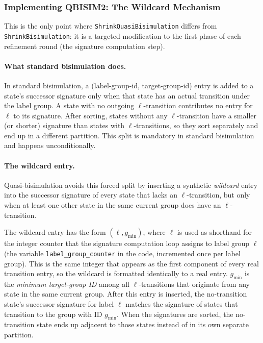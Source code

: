 \documentclass[11pt,a4paper]{article}
\begin{document}
\subsubsection{Implementing QBISIM2: The Wildcard Mechanism}

This is the only point where \texttt{ShrinkQuasiBisimulation} differs from
\texttt{ShrinkBisimulation}: it is a targeted modification to the first phase
of each refinement round (the signature computation step).

\paragraph{What standard bisimulation does.}
In standard bisimulation, a (label-group-id, target-group-id) entry is added
to a state's successor signature only when that state has an actual transition
under the label group.  A state with no outgoing $\ell$-transition contributes
no entry for $\ell$ to its signature.  After sorting, states without any
$\ell$-transition have a smaller (or shorter) signature than states with
$\ell$-transitions, so they sort separately and end up in a different partition.
This split is mandatory in standard bisimulation and happens unconditionally.

\paragraph{The wildcard entry.}
Quasi-bisimulation avoids this forced split by inserting a synthetic
\emph{wildcard} entry into the successor signature of every state that lacks
an $\ell$-transition, but only when at least one other state in the same
current group does have an $\ell$-transition.

The wildcard entry has the form $(\ell, g_{\min})$, where $\ell$ is used as
shorthand for the integer counter that the signature computation loop assigns
to label group $\ell$ (the variable \texttt{label\_group\_counter} in the
code, incremented once per label group).  This is the same integer that
appears as the first component of every real transition entry, so the wildcard
is formatted identically to a real entry.  $g_{\min}$ is the \emph{minimum
target-group ID} among all $\ell$-transitions that originate from any state in
the same current group.  After this entry is inserted, the no-transition
state's successor signature for label $\ell$ matches the signature of states
that transition to the group with ID $g_{\min}$.  When the signatures are
sorted, the no-transition state ends up adjacent to those states instead of in
its own separate partition.
\end{document}
